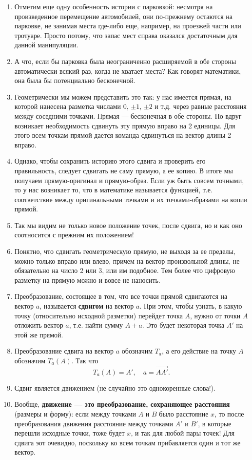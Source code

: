 \begin{enumerate}
\item Отметим еще одну особенность истории с парковкой: несмотря на произведенное перемещение автомобилей, они по-прежнему остаются на парковке, не занимая места где-либо еще, например, на проезжей части или тротуаре. Просто потому, что запас мест справа оказался достаточным для данной манипуляции.
\item А что, если бы парковка была неограниченно расширяемой в обе стороны автоматически всякий раз, когда не хватает места? Как говорят математики, она была бы потенциально бесконечной.
\item Геометрически мы можем представить это так: у нас имеется прямая, на которой нанесена разметка числами 0, $\pm 1$, $\pm 2$ и т.д. через равные расстояния между соседними точками. Прямая --- бесконечная в обе стороны. Но вдруг возникает необходимость сдвинуть эту прямую вправо на 2 единицы. Для этого всем точкам прямой дается команда сдвинуться на вектор длины 2 вправо.
\item Однако, чтобы сохранить историю этого сдвига и проверить его правильность, следует сдвигать не саму прямую, а ее копию. В итоге мы получаем прямую-оригинал и прямую-образ. Если уж быть совсем точными, то у нас возникает то, что в математике называется функцией, т.е. соответствие между оригинальными точками и их точками-образами на копии прямой.
\item Так мы видим не только новое положение точек, после сдвига, но и как оно соотносится с прежним их положением!
\item Понятно, что сдвигать геометрическую прямую, не выходя за ее пределы, можно только вправо или влево, причем на вектор произвольной длины, не обязательно на число 2 или 3, или им подобное. Тем более что цифровую разметку на прямую можно и вовсе не наносить.
\item Преобразование, состоящее в том, что все точки прямой сдвигаются на вектор $a$, называется \textbf{сдвигом} на вектор $a$. При этом, чтобы узнать, в какую точку (относительно исходной разметки) перейдет точка $A$, нужно от точки $A$ отложить вектор $a$, т.е. найти сумму $A+a$. Это будет некоторая точка $A'$ на этой же прямой.
\item Преобразование сдвига на вектор $a$ обозначим $T_a$, а его действие на точку $A$ обозначим $T_a(A)$. Так что
$$
T_a(A)=A',\quad a=\vec{AA'}.
$$
\item Сдвиг является движением (не случайно это однокоренные слова!).
\item Вообще, \textbf{движение --- это преобразование, сохраняющее расстояния} (размеры и форму): если между точками $A$ и $B$ было расстояние $x$, то после преобразования движения расстояние между точками $A'$ и $B'$, в которые перешли исходные точки, тоже будет $x$, и так для любой пары точек! Для сдвига эот очевидно, поскольку ко всем точкам прибавляется один и тот же вектор.

\end{enumerate}
